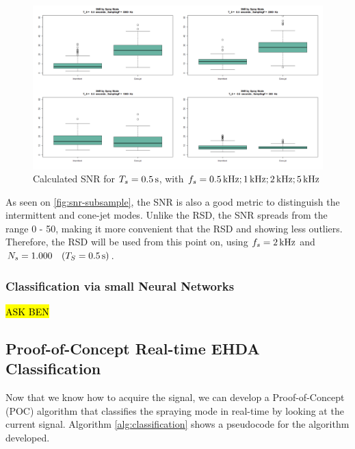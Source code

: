 \documentclass[oneside,12pt]{article}
\begin{document}
\begin{figure}[h!]
    \centering
    \includegraphics[width=\textwidth,trim=1 1 1 1,clip]{figures/snr-subsample.png}
    \caption{Calculated SNR for $T_s = 0.5 \,\mathrm{s}$, with $f_s = 0.5 \,\mathrm{kHz}; 1 \,\mathrm{kHz}; 2 \,\mathrm{kHz}; 5 \,\mathrm{kHz}$}
    \label{fig:snr-subsample}
\end{figure}

As seen on \autoref{fig:snr-subsample}, the SNR is also a good metric to distinguish the intermittent and cone-jet modes.
Unlike the RSD, the SNR spreads from the range 0 - 50, making it more convenient that the RSD and showing less outliers. 
Therefore, the RSD will be used from this point on, using $f_s = 2 \,\mathrm{kHz}$ and $N_s = 1.000 \quad (T_S = 0.5 \,\mathrm{s})$. 

\subsubsection{Classification via small Neural Networks}

\hl{ASK BEN}

\subsection{Proof-of-Concept Real-time EHDA Classification}\label{sec:classification-algorithm}

Now that we know how to acquire the signal, we can develop a Proof-of-Concept (POC)
algorithm that classifies the spraying mode in real-time by looking at the current signal.
Algorithm \ref{alg:classification} shows a pseudocode for the algorithm developed.
\end{document}
